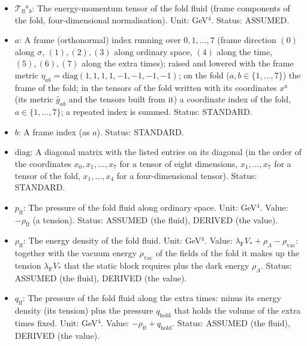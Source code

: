 \documentclass[
  10pt,
]{article}
\providecommand{\tightlist}{%
  \setlength{\itemsep}{0pt}\setlength{\parskip}{0pt}}
\begin{document}
\begin{itemize}
\tightlist
\item
  \(\mathcal{T}_{\mathrm{ff}}{}^a{}_b\): The energy-momentum tensor of
  the fold fluid (frame components of the fold, four-dimensional
  normalisation). Unit: GeV\(^4\). Status: ASSUMED.
\item
  \(a\): A frame (orthonormal) index running over \(0, 1, \dots, 7\)
  (frame direction \((0)\) along \(\sigma\), \((1), (2), (3)\) along
  ordinary space, \((4)\) along the time, \((5), (6), (7)\) along the
  extra times); raised and lowered with the frame metric
  \(\eta_{ab} = \mathrm{diag}(1, 1, 1, 1, -1, -1, -1, -1)\); on the fold
  (\(a, b \in \{1, \dots, 7\}\)) the frame of the fold; in the tensors
  of the fold written with its coordinates \(x^a\) (its metric
  \(\hat g_{ab}\) and the tensors built from it) a coordinate index of
  the fold, \(a \in \{1, \dots, 7\}\); a repeated index is summed.
  Status: STANDARD.
\item
  \(b\): A frame index (as \(a\)). Status: STANDARD.
\item
  \(\mathrm{diag}\): A diagonal matrix with the listed entries on its
  diagonal (in the order of the coordinates \(x_0, x_1, \dots, x_7\) for
  a tensor of eight dimensions, \(x_1, \dots, x_7\) for a tensor of the
  fold, \(x_1, \dots, x_4\) for a four-dimensional tensor). Status:
  STANDARD.
\item
  \(p_{\mathrm{ff}}\): The pressure of the fold fluid along ordinary
  space. Unit: GeV\(^4\). Value: \(-\rho_{\mathrm{ff}}\) (a tension).
  Status: ASSUMED (the fluid), DERIVED (the value).
\item
  \(\rho_{\mathrm{ff}}\): The energy density of the fold fluid. Unit:
  GeV\(^4\). Value:
  \(\lambda_{\mathrm{F}}V_* + \rho_\Lambda - \rho_{\mathrm{vac}}\):
  together with the vacuum energy \(\rho_{\mathrm{vac}}\) of the fields
  of the fold it makes up the tension \(\lambda_{\mathrm{F}}V_*\) that
  the static block requires plus the dark energy \(\rho_\Lambda\).
  Status: ASSUMED (the fluid), DERIVED (the value).
\item
  \(q_{\mathrm{ff}}\): The pressure of the fold fluid along the extra
  times: minus its energy density (its tension) plus the pressure
  \(q_{\mathrm{hold}}\) that holds the volume of the extra times fixed.
  Unit: GeV\(^4\). Value: \(-\rho_{\mathrm{ff}} + q_{\mathrm{hold}}\).
  Status: ASSUMED (the fluid), DERIVED (the value).
\end{itemize}
\end{document}
